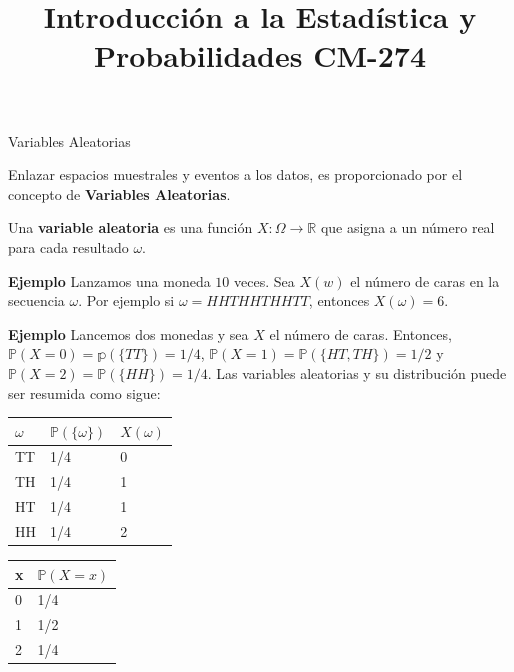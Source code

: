 \documentclass{article}\usepackage[]{graphicx}\usepackage[]{color}
\begin{document}
\title{Introducci\'on a la Estad\'istica y Probabilidades CM-274}
\date{}
\maketitle

\vspace{0.3cm}

{\Large Variables Aleatorias}



\vspace{0.8cm}

Enlazar espacios muestrales y eventos a los datos, es proporcionado por el concepto de \textbf{Variables Aleatorias}.

\vspace{0.5cm}

Una \textbf{variable aleatoria} es una funci\'on $X:\Omega \rightarrow \mathbb{R}$ que asigna a un n\'umero real para cada resultado $\omega$.

\vspace{0.3cm}

\textbf{Ejemplo} Lanzamos una moneda $10$ veces. Sea $X(w)$ el n\'umero de caras en la secuencia $\omega$. Por ejemplo si $\omega = HHTHHTHHTT$, entonces $X(\omega) = 6$.

\vspace{0.3cm}

\textbf{Ejemplo} Lancemos dos monedas y sea $X$ el n\'umero de caras. Entonces, $\mathbb{P}(X = 0) = \mathbb{p}(\{TT\}) = 1/4$, $\mathbb{P}(X = 1) = \mathbb{P}(\{ HT, TH\}) = 1/2$ y $\mathbb{P}(X = 2) = \mathbb{P}(\{HH \} ) = 1/4$. Las variables aleatorias y su distribuci\'on puede ser resumida como sigue:

\vspace{0.5cm}

\begin{minipage}{2.5in}
\centering
\begin{tabular}{l l |l}
$\omega$ & $\mathbb{P}(\{ \omega \})$ & $X(\omega)$\\
\hline
TT     & 1/4                        & 0         \\
TH     & 1/4                        & 1         \\
HT     & 1/4                        & 1         \\
HH     & 1/4                        & 2        
\end{tabular}
\end{minipage}
\begin{minipage}{2.5in}
\centering
\begin{tabular}{l|l}
x & $\mathbb{P}(X = x)$ \\
\hline
0 & 1/4                 \\
1 & 1/2                 \\
2 &  1/4                  
\end{tabular}
\end{minipage}
\end{document}
